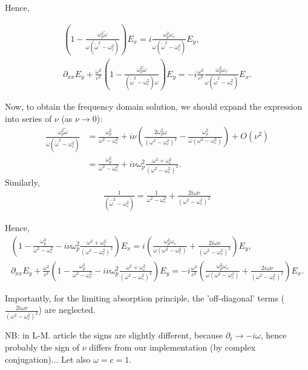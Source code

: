 \documentclass[a4paper,10pt]{article}
\begin{document}
Hence,

\begin{align*}
\left(1-\frac{\omega_p^2\tilde{\omega}}{\omega(\tilde{\omega}^2-\omega_c^2)}\right)E_x=i\frac{\omega_p^2\omega_c}{\omega(\tilde{\omega}^2-\omega_c^2)}E_y,\\
\partial_{xx} E_y+\frac{\omega^2}{c^2}\left(1-\frac{\omega_p^2\tilde{\omega}}{(\tilde{\omega}^2-\omega_c^2)\omega}\right)E_y=
-i\frac{\omega^2}{c^2}\frac{\omega_p^2 \omega_c}{\omega(\tilde{\omega}^2-\omega^2_c)}E_x.
\end{align*}

Now, to obtain the frequency domain solution, we should expand the expression into series of $\nu$ (as $\nu\rightarrow 0$):
\begin{align*}
 \frac{\omega_p^2\tilde{\omega}}{\omega(\tilde{\omega}^2-\omega_c^2)}&=
 \frac{\omega_p^2}{\omega^2-\omega_c^2}+i\nu\left(
 \frac{2\omega_p^2\omega}{(\omega^2-\omega^2_c)^2}-
 \frac{\omega_p^2}{\omega(\omega^2-\omega_c^2)}\right)+O(\nu^2)\\
 &=\frac{\omega_p^2}{\omega^2-\omega_c^2}+i\nu\omega_p^2\frac{\omega^2+\omega_c^2}{(\omega^2-\omega_c^2)^2}.
\end{align*}
Similarly,
\begin{align*}
 \frac{1}{(\tilde{\omega}^2-\omega^2_c)}=\frac{1}{\omega^2-\omega_c^2}+\frac{2i\omega\nu}{(\omega^2-\omega^2_c)^2}
\end{align*}

Hence,
\begin{align*}
\left(1-\frac{\omega_p^2}{\omega^2-\omega_c^2}-i\nu\omega_p^2\frac{\omega^2+\omega_c^2}{(\omega^2-\omega_c^2)^2}\right)E_x=
i\left(\frac{\omega_p^2\omega_c}{\omega(\omega^2-\omega_c^2)}+\frac{2i\omega\nu}{(\omega^2-\omega^2_c)^2}\right)E_y,\\
\partial_{xx} E_y+\frac{\omega^2}{c^2}
\left(1-\frac{\omega_p^2}{\omega^2-\omega_c^2}-i\nu\omega_p^2\frac{\omega^2+\omega_c^2}{(\omega^2-\omega_c^2)^2}\right)E_y=
-i\frac{\omega^2}{c^2}\left(\frac{\omega_p^2\omega_c}{\omega(\omega^2-\omega_c^2)}+\frac{2i\omega\nu}{(\omega^2-\omega^2_c)^2}\right)E_x.
\end{align*}

Importantly, for the limiting absorption principle, the 'off-diagonal' terms ($\frac{2i\omega\nu}{(\omega^2-\omega^2_c)^2}$) are neglected.



NB: in L-M. article the signs are slightly different, because $\partial_t \rightarrow -i\omega$, hence probably the sign of $\nu$ differs from our implementation (by complex conjugation)...
Let also $\omega=c=1$. 
\end{document}

